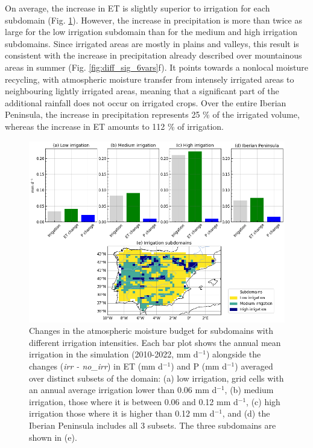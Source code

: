On average, the increase in ET is slightly superior to irrigation for each subdomain (Fig. \ref{fig:moisture_budget_annual}).
However, the increase in precipitation is more than twice as large for the low irrigation subdomain than for the medium and high irrigation subdomains. Since irrigated areas are mostly in plains and valleys, this result is consistent with the increase in precipitation already described over mountainous areas in summer (Fig. \ref{fig:diff_sig_6vars}f). It points towards a nonlocal moisture recycling, with atmospheric moisture transfer from intensely irrigated areas to neighbouring lightly irrigated areas, meaning that a significant part of the additional rainfall does not occur on irrigated crops.
Over the entire Iberian Peninsula, the increase in precipitation represents 25 \% of the irrigated volume, whereas the increase in ET amounts to 112 \% of irrigation.


\begin{figure}[htbp]
    \centering
    \includegraphics[width=\textwidth]{images/chap4/article/f09_v2.png}
    \caption{Changes in the atmospheric moisture budget for subdomains with different irrigation intensities. Each bar plot shows the annual mean irrigation in the \irr simulation (2010-2022, mm d$^{-1}$) alongside the changes (\textit{irr - no\_irr}) in ET (mm d$^{-1}$) and P (mm d$^{-1}$) averaged over distinct subsets of the domain: (a) low irrigation, grid cells with an annual average irrigation lower than 0.06 mm d$^{-1}$, (b) medium irrigation, those where it is between 0.06 and 0.12 mm d$^{-1}$, (c) high irrigation those where it is higher than 0.12 mm d$^{-1}$, and (d) the Iberian Peninsula includes all 3 subsets. The three subdomains are shown in (e).}
    \label{fig:moisture_budget_annual}
\end{figure}

\clearpage
